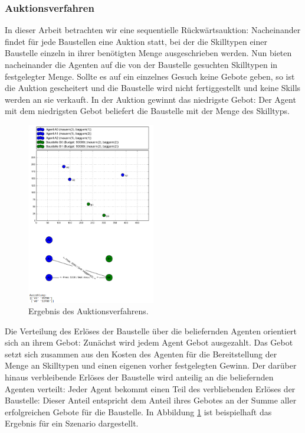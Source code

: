 \subsubsection{Auktionsverfahren}
In dieser Arbeit betrachten wir eine sequentielle Rückwärtsauktion: Nacheinander findet für jede Baustellen eine Auktion statt, bei der die Skilltypen einer Baustelle einzeln in ihrer benötigten Menge ausgeschrieben werden. Nun bieten nacheinander die Agenten auf die  von der Baustelle gesuchten Skilltypen in festgelegter Menge. Sollte es auf ein einzelnes Gesuch keine Gebote geben, so ist die Auktion gescheitert und die Baustelle wird nicht fertiggestellt und keine Skills werden an sie verkauft. In der Auktion gewinnt das niedrigste Gebot: Der Agent mit dem niedrigsten Gebot beliefert die Baustelle mit der Menge des Skilltyps.

\begin{figure}
  \centering
  \includegraphics[width=0.5\textwidth]{example-srg.png}
  \caption{Ergebnis des Auktionsverfahrens.}
  \label{example-srg}
\end{figure}

Die Verteilung des Erlöses der Baustelle über die beliefernden Agenten orientiert sich an ihrem Gebot: Zunächst wird jedem Agent Gebot ausgezahlt. Das Gebot setzt sich zusammen aus den Kosten des Agenten für die Bereitstellung der Menge an Skilltypen und einen eigenen vorher festgelegten Gewinn. Der darüber hinaus verbleibende Erlöses der Baustelle wird anteilig an die beliefernden Agenten verteilt: Jeder Agent bekommt einen Teil des verbliebenden Erlöses der Baustelle: Dieser Anteil entspricht dem Anteil ihres Gebotes an der Summe aller erfolgreichen Gebote für die Baustelle. In Abbildung \ref{example-srg} ist beispielhaft das Ergebnis für ein Szenario dargestellt.

